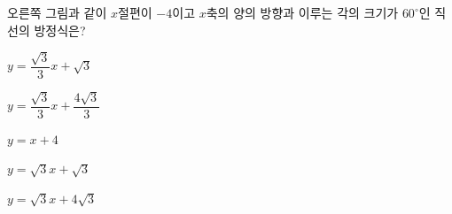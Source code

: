 \noindent\begin{minipage}[t]{0.58\linewidth}\vspace{0pt}\raggedright 오른쪽 그림과 같이 $x$절편이 $-4$이고 $x$축의 양의 방향과 이루는 각의 크기가 $60^\circ$인 직선의 방정식은?\end{minipage}\hfill\begin{minipage}[t]{0.4\linewidth}\vspace{0pt}\centering \resizebox{\ifdim\width>\linewidth\linewidth\else\width\fi}{!}{}\end{minipage}\par
\begin{choicesv}{\rule[-3ex]{0pt}{8ex}$y=\dfrac{\sqrt{3}}{3}x+\sqrt{3}$}{\rule[-3ex]{0pt}{8ex}$y=\dfrac{\sqrt{3}}{3}x+\dfrac{4\sqrt{3}}{3}$}{\rule[-3ex]{0pt}{8ex}$y=x+4$}{\rule[-3ex]{0pt}{8ex}$y=\sqrt{3}x+\sqrt{3}$}{\rule[-3ex]{0pt}{8ex}$y=\sqrt{3}x+4\sqrt{3}$}\end{choicesv}
